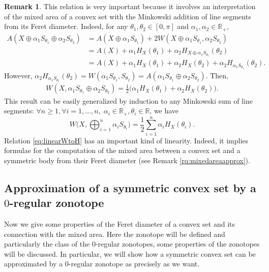 \documentclass[numbers,compress,v1.0.1]{vmsta}
\theoremstyle{definition}
\newtheorem{remark}{Remark}
\begin{document}
\begin{remark}
This relation is very important because it involves an interpretation
of the mixed area of a convex set with the Minkowski addition of line
segments from its Feret diameter. Indeed, for any $\theta_1,\theta_2\in
[0,\pi]$ and $\alpha_1,\alpha_2\in\mathbb{R}_+$,
%
\begin{align*}
A(X\oplus\alpha_1 S_{\theta_1}\oplus\alpha_2
S_{\theta_2})&=A(X\oplus \alpha_1 S_{\theta_1})+2W(X\oplus
\alpha_1 S_{\theta_1},\alpha_2 S_{\theta_2})
\\
&=A(X)+\alpha_1 H_X(\theta_1)+
\alpha_2 H_{X\oplus\alpha_1 S_{\theta
_1}}(\theta_2)
\\
&=A(X)+\alpha_1 H_X(\theta_1)+
\alpha_2 H_{X}(\theta_2)+\alpha_2
H_{\alpha_1 S_{\theta_1}}(\theta_2).
\end{align*}
%
However, $ \alpha_2 H_{\alpha_1S_{\theta_1}}(\theta_2)=W(\alpha_1
S_{\theta_1},S_{\theta_2})=A(\alpha_1 S_{\theta_1}\oplus\alpha_2
S_{\theta_2})$. Then,
%
\begin{align*}
W(X,\alpha_1 S_{\theta_1}\oplus\alpha_2
S_{\theta_2})=\frac
{1}{2}\bigl(\alpha_1 H_X(
\theta_1)+\alpha_2 H_{X}(\theta_2)
\bigr).
\end{align*}
%
This result can be easily generalized by induction to any Minkowski sum
of line segments: $\forall n\geq1,\forall i=1,\dots, n,\; \alpha_i\in
\mathbb{R}_+,\theta_i\in\mathbb{R} $, we have
%
\begin{equation}
W\Biggl(X ,\bigoplus_{i=1}^n
\alpha_i S_{\theta_i}\Biggr)=\frac{1}{2}\sum
_{i=1}^n \alpha_i H_X(
\theta_i). \label{eq:linearWtoH}
\end{equation}
%
Relation \eqref{eq:linearWtoH} has an important kind of linearity.
Indeed, it implies formulae for the computation of the mixed area
between a convex set and a symmetric body from their Feret diameter
\textup{(}see Remark \autoref{rq:mixedareaapprox}\textup{)}.
\end{remark}

\subsection{Approximation of a symmetric convex set by a $0$-regular zonotope}

Now we give some properties of the Feret diameter of a convex set and
its connection with the mixed area. Here the zonotope will be defined
and particularly the class of the $0$-regular zonotopes, some
properties of the zonotopes will be discussed. In particular, we will
show how a symmetric convex set can be approximated by a $0$-regular
zonotope as precisely as we want.
\end{document}

